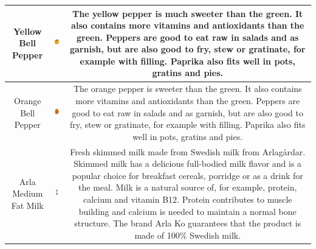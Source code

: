 \begin{table}[!ht]
{\begin{tabular}{c c c}
        \toprule
         \multicolumn{1}{p{1.5cm}}{\vspace{-15mm} {\footnotesize Yellow Bell Pepper} } & 
          \includegraphics[width=21mm, height=21mm]{PaperB/appendix/figures/iconic_images/Yellow-Pepper_Clean.jpg}  &  
         \multicolumn{1}{p{12cm}}{\vspace{-19mm} {\footnotesize The yellow pepper is much sweeter than the green. It also contains more vitamins and antioxidants than the green. Peppers are good to eat raw in salads and as garnish, but are also good to fry, stew or gratinate, for example with filling. Paprika also fits well in pots, gratins and pies.} } \\
         
         \toprule
         \multicolumn{1}{p{1.5cm}}{\vspace{-15mm} {\footnotesize Orange Bell Pepper} } & 
          \includegraphics[width=21mm, height=21mm]{PaperB/appendix/figures/iconic_images/Orange-Bell-Pepper_Iconic.jpg}  & 
         \multicolumn{1}{p{12cm}}{\vspace{-17mm} {\footnotesize The orange pepper is sweeter than the green. It also contains more vitamins and antioxidants than the green. Peppers are good to eat raw in salads and as garnish, but are also good to fry, stew or gratinate, for example with filling. Paprika also fits well in pots, gratins and pies.} } \\
         
         \toprule
         \multicolumn{1}{p{1.5cm}}{\vspace{-17mm} {\footnotesize Arla Medium Fat Milk} } &
         \includegraphics[width=21mm, height=21mm]{PaperB/appendix/figures/iconic_images/Arla-Milk-Medium-Fat_Clean.jpg} & 
         \multicolumn{1}{p{12cm}}{\vspace{-21mm} {\footnotesize Fresh skimmed milk made from Swedish milk from Arlagårdar. Skimmed milk has a delicious full-bodied milk flavor and is a popular choice for breakfast cereals, porridge or as a drink for the meal. Milk is a natural source of, for example, protein, calcium and vitamin B12. Protein contributes to muscle building and calcium is needed to maintain a normal bone structure. The brand Arla Ko guarantees that the product is made of 100\% Swedish milk.} } \\
         

\end{tabular}}
\end{table}
